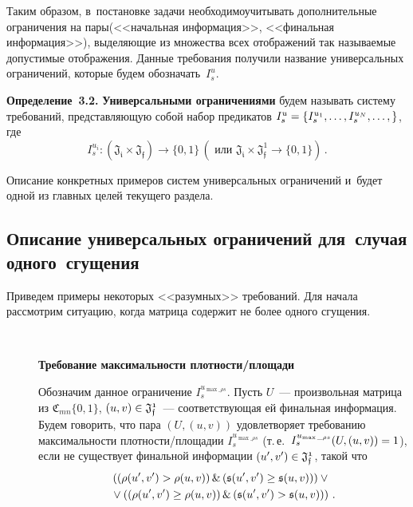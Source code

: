 \begin{multicols}{2}
Таким образом, в~постановке задачи необходимо\linebreak учитывать дополнительные 
ограничения на пары\linebreak (<<начальная информация>>, <<финальная информа\-ция>>), 
выделяющие из множества всех отоб\-ра\-же\-ний так называемые допустимые отоб\-ра\-же\-ния.
Данные требования получили название универсальных ограничений, которые будем 
обозначать~$I_s^u$.

\smallskip

\noindent
\textbf{Определение~3.2.} \textbf{Универсальными 
ограничениями {}} будем называть систему требований, представляющую 
собой набор предикатов $I_s^u \hm= \{I_s^{u_1}, \ldots, I_s^{u_N}, \ldots, \}$, 
где 
$$
{I_s^{u_i}}: (\mathfrak{J_i}\times\mathfrak{J_f})\rightarrow \{0,1\}\, 
\left(\mbox{ или~}\mathfrak{J_i}\times\mathfrak{J_f^1} \rightarrow \{0,1\}\right)\,.
$$

 Описание конкретных примеров систем универсальных ограничений и~будет одной из 
главных целей текущего раздела.

\subsection{Описание универсальных ограничений для~случая одного~сгущения}

Приведем примеры некоторых <<разумных>> требований. Для начала рассмотрим 
ситуацию, когда матрица содержит не более одного сгущения.
\begin{description}
\item[\,] \textbf{Требование максимальности плот\-ности/пло\-щади}

Обозначим данное ограничение $I_s^{u_{\max\_\rho s}}$. Пусть $U$~--- произвольная 
матрица из $\mathfrak{C}_{mn}\{0,1\}$, $(u,v)\hm\in  \mathfrak{J_f^1}$~---
соответствующая ей финальная информация. Будем говорить, что пара $(U, (u,v))$ 
удовлетворяет требованию максимальности плотности/площадии $I_s^{u_{\max\_\rho 
s}}$ (т.\,е.\ $I_s^{u_{\max\_\rho s}}(U,(u,v))\hm=1$), если не существует финальной 
информации  $(u',v') \hm\in  \mathfrak{J_f^1}$, такой что
\begin{multline*}
 \hspace*{-1mm}\left ( \left(\rho(u',v') > \rho(u,v)\right)  \&  
\left(\mathfrak{s}(u',v') \geq  \mathfrak{s}(u,v)\right)\right) \vee {}
\\
{} \vee 
\left(\left(\rho(u',v')\geq \rho(u,v)\right) \&  \left(\mathfrak{s}(u',v') > 
\mathfrak{s}(u,v)\right)\right)\,.
\end{multline*}



\end{description}
\end{multicols}

